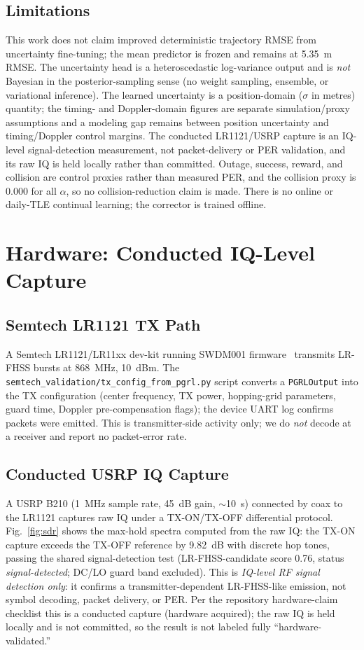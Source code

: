 \documentclass[conference]{IEEEtran}
\begin{document}
\subsection{Limitations}
This work does not claim improved deterministic trajectory RMSE from uncertainty fine-tuning; the mean predictor is frozen and remains at 5.35~m RMSE. The uncertainty head is a heteroscedastic log-variance output and is \emph{not} Bayesian in the posterior-sampling sense (no weight sampling, ensemble, or variational inference). The learned uncertainty is a position-domain ($\sigma$ in metres) quantity; the timing- and Doppler-domain figures are separate simulation/proxy assumptions and a modeling gap remains between position uncertainty and timing/Doppler control margins. The conducted LR1121/USRP capture is an IQ-level signal-detection measurement, not packet-delivery or PER validation, and its raw IQ is held locally rather than committed. Outage, success, reward, and collision are control proxies rather than measured PER, and the collision proxy is $0.000$ for all $\alpha$, so no collision-reduction claim is made. There is no online or daily-TLE continual learning; the corrector is trained offline.

\section{Hardware: Conducted IQ-Level Capture}
\label{sec:hardware}

\subsection{Semtech LR1121 TX Path}
A Semtech LR1121/LR11xx dev-kit running SWDM001 firmware~\cite{swdm001} transmits LR-FHSS bursts at 868~MHz, 10~dBm. The \texttt{semtech\_validation/tx\_config\_from\_pgrl.py} script converts a \texttt{PGRLOutput} into the TX configuration (center frequency, TX power, hopping-grid parameters, guard time, Doppler pre-compensation flags); the device UART log confirms packets were emitted. This is transmitter-side activity only; we do \emph{not} decode at a receiver and report no packet-error rate.

\subsection{Conducted USRP IQ Capture}
A USRP B210 (1~MHz sample rate, 45~dB gain, $\sim$10~s) connected by coax to the LR1121 captures raw IQ under a TX-ON/TX-OFF differential protocol. Fig.~\ref{fig:sdr} shows the max-hold spectra computed from the raw IQ: the TX-ON capture exceeds the TX-OFF reference by 9.82~dB with discrete hop tones, passing the shared signal-detection test (LR-FHSS-candidate score 0.76, status \emph{signal-detected}; DC/LO guard band excluded). This is \emph{IQ-level RF signal detection only}: it confirms a transmitter-dependent LR-FHSS-like emission, not symbol decoding, packet delivery, or PER. Per the repository hardware-claim checklist this is a conducted capture (hardware acquired); the raw IQ is held locally and is not committed, so the result is not labeled fully ``hardware-validated.''
\end{document}
